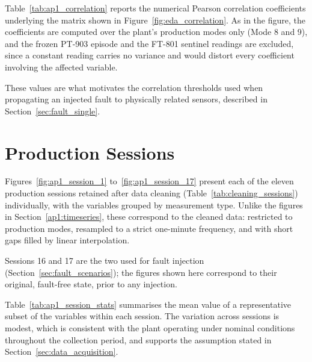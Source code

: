 Table~\ref{tab:ap1_correlation} reports the numerical Pearson correlation coefficients
underlying the matrix shown in Figure~\ref{fig:eda_correlation}. As in the figure, the
coefficients are computed over the plant's production modes only (Mode 8 and 9), and the
frozen PT-903 episode and the FT-801 sentinel readings are excluded, since a constant
reading carries no variance and would distort every coefficient involving the affected
variable.

These values are what motivates the correlation thresholds used when propagating an
injected fault to physically related sensors, described in
Section~\ref{sec:fault_single}.

\begin{table}[htbp]
\centering
\caption{Pearson correlation coefficients between the continuous process variables,
restricted to production modes (Mode 8 and 9).}
\label{tab:ap1_correlation}
\tiny

\end{table}

\section{Production Sessions} \label{ap1:sessions}

Figures~\ref{fig:ap1_session_1} to~\ref{fig:ap1_session_17} present each of the eleven
production sessions retained after data cleaning
(Table~\ref{tab:cleaning_sessions}) individually, with the variables grouped by
measurement type. Unlike the figures in Section~\ref{ap1:timeseries}, these correspond to
the cleaned data: restricted to production modes, resampled to a strict one-minute
frequency, and with short gaps filled by linear interpolation.

Sessions 16 and 17 are the two used for fault injection
(Section~\ref{sec:fault_scenarios}); the figures shown here correspond to their original,
fault-free state, prior to any injection.

Table~\ref{tab:ap1_session_stats} summarises the mean value of a representative subset of
the variables within each session. The variation across sessions is modest, which is
consistent with the plant operating under nominal conditions throughout the collection
period, and supports the assumption stated in Section~\ref{sec:data_acquisition}.

\begin{table}[htbp]
\centering
\caption{Per-session mean values of a representative subset of the process variables.}
\label{tab:ap1_session_stats}
\small

\end{table}


